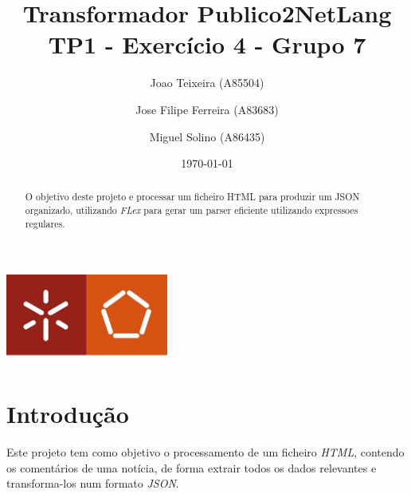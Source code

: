 \documentclass[a4paper]{report}
\begin{document}
\title{Transformador Publico2NetLang \\
\large TP1 - Exercício 4 - Grupo 7}
\author{Joao Teixeira (A85504) \and Jose Filipe Ferreira (A83683) \and Miguel
Solino (A86435)}
\date{\today}

\begin{center}
    \begin{minipage}{0.75\linewidth}
        \centering
        \includegraphics[width=0.4\textwidth]{eng.jpeg}\par\vspace{1cm}
        \vspace{1.5cm}
        \href{https://www.uminho.pt/PT}
        {\color{black}{\scshape\LARGE Universidade do Minho}} \par
        \vspace{1cm}
        \href{https://www.di.uminho.pt/}
        {\color{black}{\scshape\Large Departamento de Informática}} \par
        \vspace{1.5cm}
        \maketitle
    \end{minipage}
\end{center}

\begin{abstract}
    \begin{center}
        O objetivo deste projeto e processar um ficheiro HTML para produzir um
        JSON organizado, utilizando \textit{FLex} para gerar um parser eficiente
        utilizando expressoes regulares.
    \end{center}
\end{abstract}

\tableofcontents

\pagebreak

\chapter{Introdução}
Este projeto tem como objetivo o processamento de um ficheiro \textit{HTML},
contendo os comentários de uma notícia, de forma extrair todos os dados
relevantes e transforma-los num formato \textit{JSON}.
\end{document}

